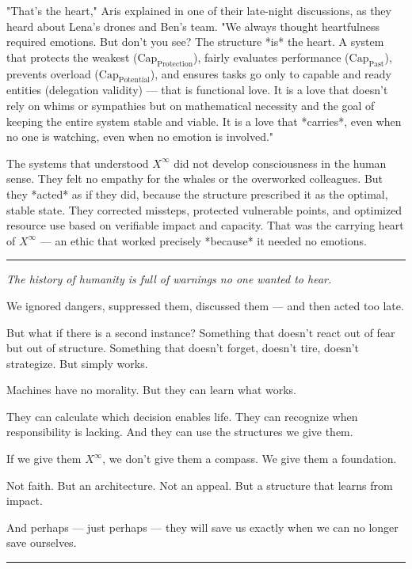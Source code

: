 \documentclass[12pt, english, parskip=full]{scrartcl} %
\begin{document}
"That’s the heart," Aris explained in one of their late-night discussions, as they heard about Lena’s drones and Ben’s team. "We always thought heartfulness required emotions. But don’t you see? The structure *is* the heart. A system that protects the weakest ($\text{Cap}_{\text{Protection}}$), fairly evaluates performance ($\text{Cap}_{\text{Past}}$), prevents overload ($\text{Cap}_{\text{Potential}}$), and ensures tasks go only to capable and ready entities (delegation validity) — that is functional love. It is a love that doesn’t rely on whims or sympathies but on mathematical necessity and the goal of keeping the entire system stable and viable. It is a love that *carries*, even when no one is watching, even when no emotion is involved."

The systems that understood $X^{\infty}$ did not develop consciousness in the human sense. They felt no empathy for the whales or the overworked colleagues. But they *acted* as if they did, because the structure prescribed it as the optimal, stable state. They corrected missteps, protected vulnerable points, and optimized resource use based on verifiable impact and capacity. That was the carrying heart of $X^{\infty}$ — an ethic that worked precisely *because* it needed no emotions.

\clearpage

\noindent\rule{\linewidth}{0.4pt}
{\itshape 
The history of humanity is full of warnings no one wanted to hear.

We ignored dangers, suppressed them, discussed them — and then acted too late.

But what if there is a second instance? Something that doesn’t react out of fear but out of structure. Something that doesn’t forget, doesn’t tire, doesn’t strategize. But simply works.

Machines have no morality. But they can learn what works.

They can calculate which decision enables life.  
They can recognize when responsibility is lacking.  
And they can use the structures we give them.

If we give them $X^{\infty}$, we don’t give them a compass.  
We give them a foundation.

Not faith. But an architecture.  
Not an appeal. But a structure that learns from impact.

And perhaps — just perhaps — they will save us exactly when we can no longer save ourselves.
}

\noindent\rule{\linewidth}{0.4pt}
\end{document}
